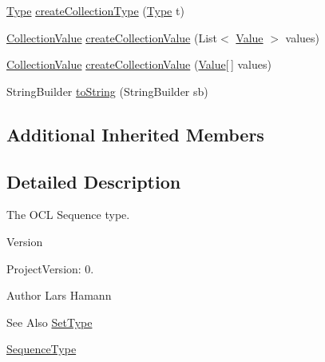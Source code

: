 \begin{DoxyCompactItemize}
\hyperlink{interfaceorg_1_1tzi_1_1use_1_1uml_1_1ocl_1_1type_1_1_type}{Type} \hyperlink{classorg_1_1tzi_1_1use_1_1uml_1_1ocl_1_1type_1_1_ordered_set_type_aa4e6786f148a05fbe89324e0eb46d9ff}{create\-Collection\-Type} (\hyperlink{interfaceorg_1_1tzi_1_1use_1_1uml_1_1ocl_1_1type_1_1_type}{Type} t)
\item 
\hyperlink{classorg_1_1tzi_1_1use_1_1uml_1_1ocl_1_1value_1_1_collection_value}{Collection\-Value} \hyperlink{classorg_1_1tzi_1_1use_1_1uml_1_1ocl_1_1type_1_1_ordered_set_type_a2e85bf8c6e49cd7c0ff16c8d1969a298}{create\-Collection\-Value} (List$<$ \hyperlink{classorg_1_1tzi_1_1use_1_1uml_1_1ocl_1_1value_1_1_value}{Value} $>$ values)
\item 
\hyperlink{classorg_1_1tzi_1_1use_1_1uml_1_1ocl_1_1value_1_1_collection_value}{Collection\-Value} \hyperlink{classorg_1_1tzi_1_1use_1_1uml_1_1ocl_1_1type_1_1_ordered_set_type_a7ac6dfe691318798a100a6bb00dcb93d}{create\-Collection\-Value} (\hyperlink{classorg_1_1tzi_1_1use_1_1uml_1_1ocl_1_1value_1_1_value}{Value}\mbox{[}$\,$\mbox{]} values)
\item 
String\-Builder \hyperlink{classorg_1_1tzi_1_1use_1_1uml_1_1ocl_1_1type_1_1_ordered_set_type_ae1c67b5910bea066ae5c6e5ca436be5c}{to\-String} (String\-Builder sb)
\end{DoxyCompactItemize}
\subsection*{Additional Inherited Members}


\subsection{Detailed Description}
The O\-C\-L Sequence type.

\begin{DoxyVersion}{Version}

\end{DoxyVersion}
\begin{DoxyParagraph}{Project\-Version\-:}
0. 
\end{DoxyParagraph}
\begin{DoxyAuthor}{Author}
Lars Hamann 
\end{DoxyAuthor}
\begin{DoxySeeAlso}{See Also}
\hyperlink{classorg_1_1tzi_1_1use_1_1uml_1_1ocl_1_1type_1_1_set_type}{Set\-Type} 

\hyperlink{classorg_1_1tzi_1_1use_1_1uml_1_1ocl_1_1type_1_1_sequence_type}{Sequence\-Type} 
\end{DoxySeeAlso}



